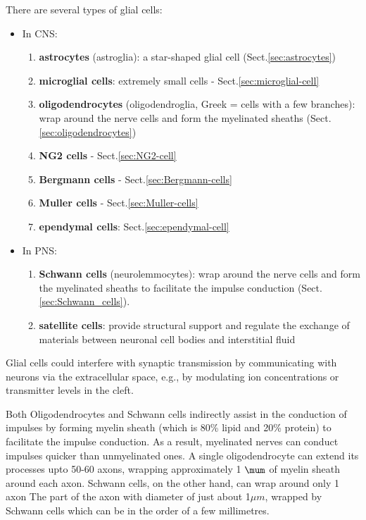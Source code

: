 There are several types of glial cells:
\begin{itemize}
  \item In CNS:
\begin{enumerate}
  
  \item {\bf astrocytes} (astroglia): a star-shaped glial cell
  (Sect.\ref{sec:astrocytes})
    
  \item {\bf microglial cells}: extremely small cells -
  Sect.\ref{sec:microglial-cell}
  
  \item {\bf oligodendrocytes} (oligodendroglia, Greek = cells with a few
  branches): wrap around the nerve cells and form the myelinated sheaths
  (Sect.\ref{sec:oligodendrocytes})
  
  \item {\bf NG2 cells} - Sect.\ref{sec:NG2-cell}
  
  
  \item {\bf Bergmann cells} - Sect.\ref{sec:Bergmann-cells}
  
  \item {\bf Muller cells} - Sect.\ref{sec:Muller-cells}
  
  \item {\bf ependymal cells}: Sect.\ref{sec:ependymal-cell}
  
\end{enumerate}

  \item In PNS: 
\begin{enumerate}
    \item {\bf Schwann cells} (neurolemmocytes): wrap around the nerve cells
    and form the myelinated sheaths to facilitate the impulse conduction
    (Sect.\ref{sec:Schwann_cells}).

   \item {\bf satellite cells}: provide structural support and
regulate the exchange of materials between
neuronal cell bodies and interstitial fluid    
\end{enumerate}
\end{itemize}
Glial cells could interfere with synaptic transmission by communicating with
neurons via the extracellular space, e.g., by modulating ion concentrations or
transmitter levels in the cleft.

Both Oligodendrocytes and Schwann cells indirectly assist in the conduction of
impulses by forming myelin sheath (which  is 80\% lipid and 20\% protein) to
facilitate the impulse conduction.
As a result, myelinated nerves can conduct impulses quicker than unmyelinated
ones. A single oligodendrocyte can extend its processes upto 50-60 axons,
wrapping approximately 1 $\mum$ of myelin sheath around each axon.
Schwann cells, on the other hand, can wrap around only 1 axon The part of the
axon with diameter of just about 1$\mu m$, wrapped by Schwann cells which can be
in the order of a few millimetres.

